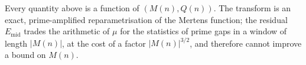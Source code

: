 \documentclass[11pt]{amsart}
\theoremstyle{definition}
\newcommand{\mob}{\mu}
\newcommand{\Mert}{M}
\newcommand{\Sq}{Q}
\begin{document}
Every quantity above is a function of $(\Mert(n),\Sq(n))$. The transform is an
exact, prime-amplified reparametrisation of the Mertens function; the residual
$E_{\mathrm{mid}}$ trades the arithmetic of $\mob$ for the statistics of prime
gaps in a window of length $|\Mert(n)|$, at the cost of a factor
$|\Mert(n)|^{3/2}$, and therefore cannot improve a bound on $\Mert(n)$.
\end{document}
